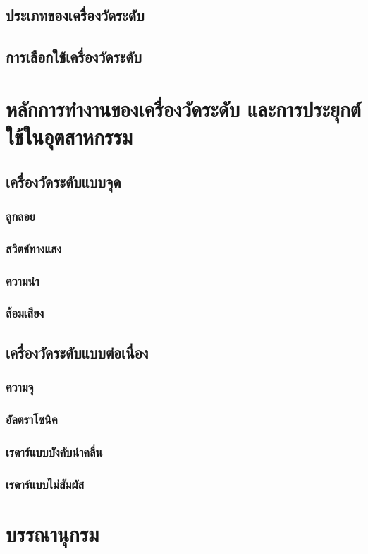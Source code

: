 \documentclass[final,11pt]{article}
\begin{document}
\subsection{ประเภทของเครื่องวัดระดับ}
\subsection{การเลือกใช้เครื่องวัดระดับ}
\section{หลักการทำงานของเครื่องวัดระดับ และการประยุกต์ใช้ในอุตสาหกรรม}
\subsection{เครื่องวัดระดับแบบจุด}
\subsubsection{ลูกลอย}
\subsubsection{สวิตช์ทางแสง}
\subsubsection{ความนำ}
\subsubsection{ส้อมเสียง}
\subsection{เครื่องวัดระดับแบบต่อเนื่อง}
\subsubsection{ความจุ}
\subsubsection{อัลตราโซนิค}
\subsubsection{เรดาร์แบบบังคับนำคลื่น}
\subsubsection{เรดาร์แบบไม่สัมผัส}
\section{บรรณานุกรม}
\end{document}
